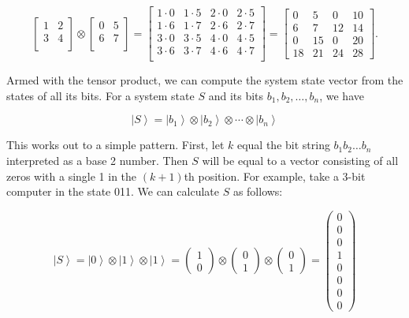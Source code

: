 \documentclass[11pt]{report}
\newcommand{\?}{\stackrel{?}{=}}
\newcommand{\qcol}[2]{\ensuremath{\begin{pmatrix} #1 \\ #2 \end{pmatrix}}}
\begin{document}
$$
  \begin{bmatrix}
    1 & 2 \\
    3 & 4 \\
  \end{bmatrix}
\otimes
  \begin{bmatrix}
    0 & 5 \\
    6 & 7 \\
  \end{bmatrix}
=
  \begin{bmatrix}
    1\cdot 0 & 1\cdot 5 & 2\cdot 0 & 2\cdot 5 \\
    1\cdot 6 & 1\cdot 7 & 2\cdot 6 & 2\cdot 7 \\
    3\cdot 0 & 3\cdot 5 & 4\cdot 0 & 4\cdot 5 \\
    3\cdot 6 & 3\cdot 7 & 4\cdot 6 & 4\cdot 7 \\
  \end{bmatrix}
=
  \begin{bmatrix}
    0 & 5 & 0 & 10 \\
    6 & 7 & 12 & 14 \\
    0 & 15 & 0 & 20 \\
    18 & 21 & 24 & 28
  \end{bmatrix}.
$$

Armed with the tensor product, we can compute the system state vector from the states of all its bits. For a system state $S$ and its bits $b_1, b_2, \ldots, b_n$, we have

$$\left | S \right \rangle = \left | b_1 \right \rangle \otimes \left | b_2 \right \rangle \otimes \cdots \otimes \left | b_n \right \rangle$$

This works out to a simple pattern. First, let $k$ equal the bit string $b_1b_2\ldots b_n$ interpreted as a base 2 number. Then $S$ will be equal to a vector consisting of all zeros with a single 1 in the $(k+1)$th position. For example, take a 3-bit computer in the state 011. We can calculate $S$ as follows:

$$\left | S \right \rangle = \left | 0 \right \rangle \otimes \left | 1 \right \rangle \otimes \left | 1 \right \rangle = \qcol{1}{0} \otimes \qcol{0}{1} \otimes \qcol{0}{1} = \begin{pmatrix}0\\0\\0\\1\\0\\0\\0\\0\end{pmatrix}$$
\end{document}
